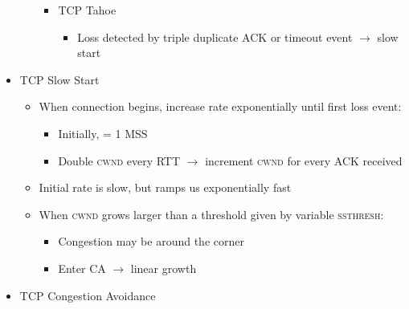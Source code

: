 \begin{itemize}
\begin{itemize}
\begin{itemize}
\begin{itemize}
            \end{itemize}

          \item TCP Tahoe

            \begin{itemize}

              \item Loss detected by triple duplicate ACK or timeout event $\to$ slow start

            \end{itemize}

        \end{itemize}

    \end{itemize}

  \item TCP Slow Start

    \begin{itemize}

      \item When connection begins, increase rate exponentially until first loss event:

        \begin{itemize}

          \item Initially,  = 1 MSS

          \item Double \textsc{cwnd} every RTT $\to$ increment \textsc{cwnd} for every ACK received

        \end{itemize}

      \item Initial rate is slow, but ramps us exponentially fast

      \item When \textsc{cwnd} grows larger than a threshold given by variable \textsc{ssthresh}:

        \begin{itemize}

          \item Congestion may be around the corner

          \item Enter CA $\to$ linear growth

        \end{itemize}

    \end{itemize}

  \item TCP Congestion Avoidance


\end{itemize}
